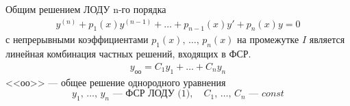 \begin{theorem*}
    Общим решением ЛОДУ n-го порядка
    \begin{align*}
        y^{(n)} + p_1(x)y^{(n-1)} + \ldots + p_{n-1}(x) y' + p_n(x) y = 0 \tag{1}
    \end{align*}
    с непрерывными коэффициентами $p_1(x),\, \ldots,\, p_n(x)$ на промежутке $I$ является линейная комбинация частных решений, входящих в ФСР.
    \begin{align*}
        y_{\text{оо}} = C_1y_1 + \ldots + C_ny_n \tag{2}
    \end{align*}
    <<оо>> --- общее решение однородного уравнения
    \[
        y_1,\, \ldots,\, y_n \text{ --- ФСР ЛОДУ (1)},\quad C_1,\, \ldots,\, C_n \text{ --- } const
    \]
\end{theorem*}
